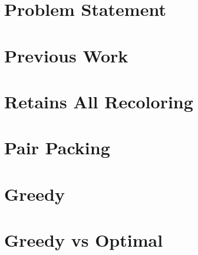 \documentclass{beamer}
\author{Gilad Kutiel}
\begin{document}


\section{Problem Statement}




\section{Previous Work}



\section{Retains All Recoloring}






\section{Pair Packing}





\section{Greedy}





\section{Greedy vs Optimal}







\end{document}
